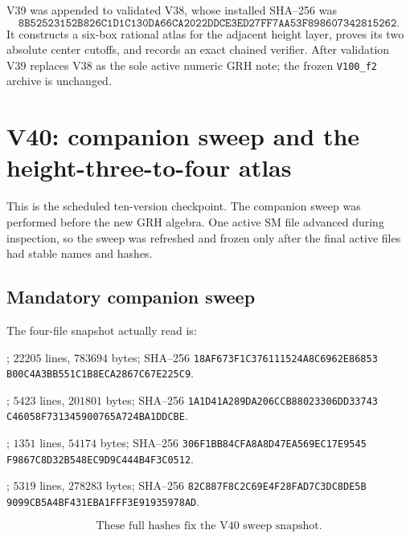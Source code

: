 \documentclass[11pt]{article}
\theoremstyle{definition}
\theoremstyle{remark}
\begin{document}
V39 was appended to validated V38, whose installed SHA--256 was
\[
 \texttt{8B52523152B826C1D1C130DA66CA2022DDCE3ED27FF7AA53F898607342815262}.
\tag{N39.11}
\]
It constructs a six-box rational atlas for the adjacent height layer,
proves its two absolute center cutoffs, and records an exact chained
verifier.  After validation V39 replaces V38 as the sole active numeric
GRH note; the frozen \texttt{V100\_f2} archive is unchanged.



\section{V40: companion sweep and the height-three-to-four atlas}
\label{sec:f2v40-sweep-atlas}

This is the scheduled ten-version checkpoint.  The companion sweep was
performed before the new GRH algebra.  One active SM file advanced during
inspection, so the sweep was refreshed and frozen only after the final
active files had stable names and hashes.

\subsection{Mandatory companion sweep}

The four-file snapshot actually read is:
\begin{sloppypar}
\raggedright
\begin{description}[leftmargin=2.8em,style=nextline]
\item[SM V71.]
;
\(22205\) lines, \(783694\) bytes; SHA--256
\texttt{18AF673F1C376111524A8C6962E86853}
\allowbreak\texttt{B00C4A3BB551C1B8ECA2867C67E225C9}.
\item[Yang--Mills V12.]
;
\(5423\) lines, \(201801\) bytes; SHA--256
\texttt{1A1D41A289DA206CCB88023306DD33743}
\allowbreak\texttt{C46058F731345900765A724BA1DDCBE}.
\item[Parallel Yang--Mills V5.]
;
\(1351\) lines, \(54174\) bytes; SHA--256
\texttt{306F1BB84CFA8A8D47EA569EC17E9545}
\allowbreak\texttt{F9867C8D32B548EC9D9C444B4F3C0512}.
\item[Navier--Stokes V26.]
;
\(5319\) lines, \(278283\) bytes; SHA--256
\texttt{82C887F8C2C69E4F28FAD7C3DC8DE5B}
\allowbreak\texttt{9099CB5A4BF431EBA1FFF3E91935978AD}.
\end{description}
\end{sloppypar}
\[
 \text{These full hashes fix the V40 sweep snapshot.}
\tag{N40.1}
\]
\end{document}
